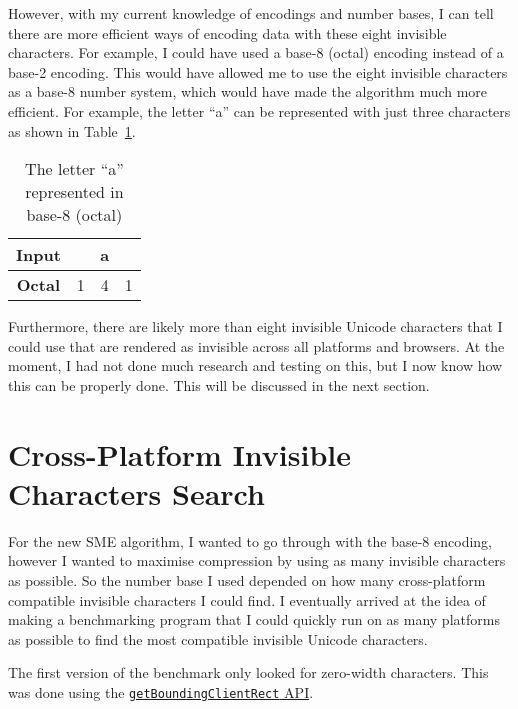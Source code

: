 \documentclass{article}
\begin{document}
However, with my current knowledge of encodings and number bases, I can tell there are more efficient ways of encoding data with these eight invisible characters. For example, I could have used a base-8 (octal) encoding instead of a base-2 encoding. This would have allowed me to use the eight invisible characters as a base-8 number system, which would have made the algorithm much more efficient. For example, the letter ``a'' can be represented with just three characters as shown in Table~\ref{tab:a-base8}.

\begin{table}[H]
  \centering
  \begin{tabular}{cccc}
    \textbf{Input}   & \multicolumn{3}{c}{a} \\ \midrule
    \textbf{Octal}   & 1 & 4 & 1             \\ \midrule
  \end{tabular}
  \caption{The letter ``a'' represented in base-8 (octal)}\label{tab:a-base8}
\end{table}

Furthermore, there are likely more than eight invisible Unicode characters that I could use that are rendered as invisible across all platforms and browsers. At the moment, I had not done much research and testing on this, but I now know how this can be properly done. This will be discussed in the next section.

\section{Cross-Platform Invisible Characters Search}

For the new SME algorithm, I wanted to go through with the base-8 encoding, however I wanted to maximise compression by using as many invisible characters as possible. So the number base I used depended on how many cross-platform compatible invisible characters I could find. I eventually arrived at the idea of making a benchmarking program that I could quickly run on as many platforms as possible to find the most compatible invisible Unicode characters.

The first version of the benchmark only looked for zero-width characters. This was done using the \href{https://developer.mozilla.org/en-US/docs/Web/API/Element/getBoundingClientRect}{\texttt{getBoundingClientRect} API}.
\end{document}
